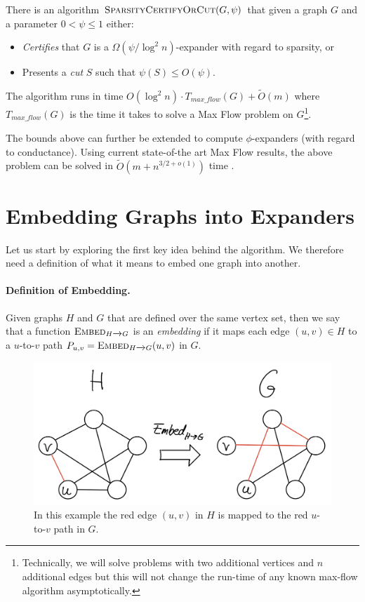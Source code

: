 \begin{theorem}
There is an algorithm $\textsc{SparsityCertifyOrCut}(G, \psi)$ that given a graph $G$ and a parameter $0 <\psi \leq 1$ either: 
\begin{itemize}
    \item \emph{Certifies} that $G$ is a $\Omega(\psi/\log^2 n)$-expander with regard to sparsity, or
    \item Presents a \emph{cut} $S$ such that $\psi(S) \leq O(\psi)$.
\end{itemize}
The algorithm runs in time $O(\log^2 n) \cdot T_{max\_flow}(G) + \tilde{O}(m)$ where $T_{max\_flow}(G)$ is the time it takes to solve a Max Flow problem on $G$\footnote{Technically, we will solve problems with two additional vertices and $n$ additional edges but this will not change the run-time of any known max-flow algorithm asymptotically.}.
\end{theorem}

The bounds above can further be extended to compute $\phi$-expanders (with regard to conductance). Using current state-of-the art Max Flow results, the above problem can be solved in $\tilde{O}(m + n^{3/2+o(1)})$ time \cite{BLLSSSW21}. 

\section{Embedding Graphs into Expanders}

Let us start by exploring the first key idea behind the algorithm. We therefore need a definition of what it means to embed one graph into another.

\paragraph{Definition of Embedding.} Given graphs $H$ and $G$ that are defined over the same vertex set, then we say that a function $\textsc{Embed}_{H \xrightarrow{} G}$ is an \emph{embedding} if it maps each edge $(u,v) \in H$ to a $u$-to-$v$ path $P_{u,v} = \textsc{Embed}_{H \xrightarrow{} G}(u,v)$ in $G$. 
\begin{figure}[!ht]
    \centering
    \includegraphics[scale=0.2]{./fig/embedGraph_lectureCutMatching.jpeg}
    \caption{In this example the red edge $(u,v)$ in $H$ is mapped to the red $u$-to-$v$ path in $G$.}
    \label{fig:my_label}
\end{figure}

